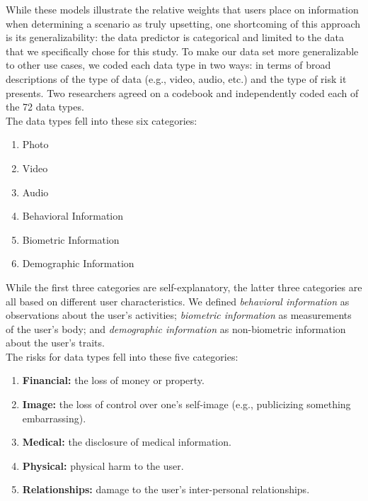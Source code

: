 \documentclass{sig-alternate-hotpets15}
\begin{document}
While these models illustrate the relative weights that users place on information when determining a scenario as truly upsetting, one shortcoming of this approach is its generalizability: the data predictor is categorical and limited to the data that we specifically chose for this study. To make our data set more generalizable to other use cases, we coded each data type in two ways: in terms of broad descriptions of the type of data (e.g., video, audio, etc.) and the type of risk it presents. Two researchers agreed on a codebook and independently coded each of the 72 data types.\\

The data types fell into these six categories:

\begin{enumerate}[topsep=0pt,itemsep=-1ex,partopsep=1ex,parsep=1ex]
\item Photo
\item Video
\item Audio
\item Behavioral Information
\item Biometric Information
\item Demographic Information
\end{enumerate}

While the first three categories are self-explanatory, the latter three categories are all based on different user characteristics. We defined {\it behavioral information} as observations about the user's activities; {\it biometric information} as measurements of the user's body; and {\it demographic information} as non-biometric information about the user's traits. \\

The risks for data types fell into these five categories:

\begin{enumerate}[topsep=0pt,itemsep=-1ex,partopsep=1ex,parsep=1ex]
\item {\bf Financial:} the loss of money or property.
\item {\bf Image:} the loss of control over one's self-image (e.g., publicizing something embarrassing).
\item {\bf Medical:} the disclosure of medical information.
\item {\bf Physical:} physical harm to the user.
\item {\bf Relationships:} damage to the user's inter-personal relationships.
\end{enumerate}
\end{document}
